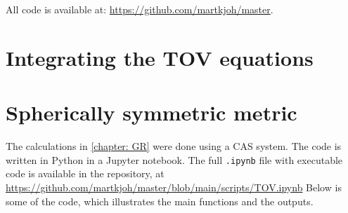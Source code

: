 \label{appendix: code} 
 
All code is available at: \url{https://github.com/martkjoh/master}.


\section{Integrating the TOV equations}

\section{Spherically symmetric metric}
The calculations in \autoref{chapter: GR} were done using a CAS system.
The code is written in Python in a Jupyter notebook.
The full \texttt{.ipynb} file with executable code is available in the repository, at \url{https://github.com/martkjoh/master/blob/main/scripts/TOV.ipynb}
Below is some of the code, which illustrates the main functions and the outputs.



